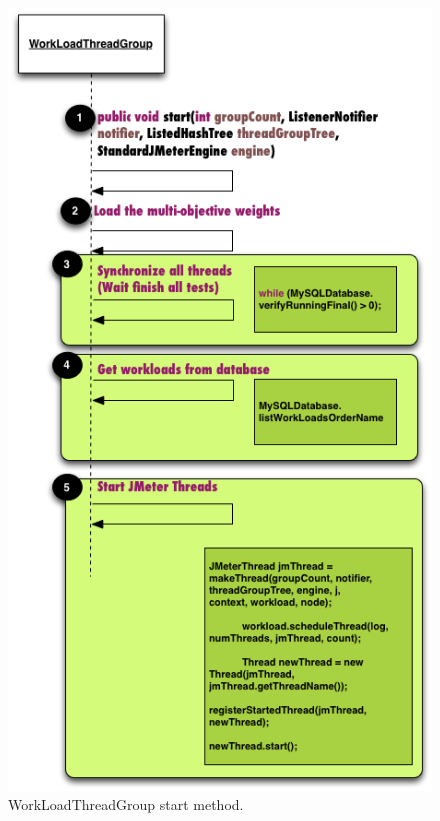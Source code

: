 \documentclass{report}
\begin{document}
\begin{figure}[h]
\begin{minipage}{.5\textwidth}
\centering
\includegraphics[width=1\textwidth]{./images/startthreads.png}
\caption{WorkLoadThreadGroup start method.}
\label{fig:startmethod}
\end{minipage}
\begin{minipage}{.5\textwidth}
\centering

\end{minipage}
\end{figure}
\end{document}
